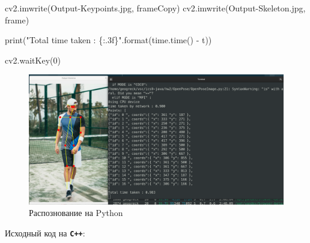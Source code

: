 \documentclass[
  12pt,
  a4paper,
]{article}
\newenvironment{Shaded}{}{}
\newcommand{\BuiltInTok}[1]{#1}
\newcommand{\DecValTok}[1]{\textcolor[rgb]{0.25,0.63,0.44}{#1}}
\newcommand{\NormalTok}[1]{#1}
\newcommand{\OperatorTok}[1]{\textcolor[rgb]{0.40,0.40,0.40}{#1}}
\newcommand{\SpecialCharTok}[1]{\textcolor[rgb]{0.25,0.44,0.63}{#1}}
\newcommand{\StringTok}[1]{\textcolor[rgb]{0.25,0.44,0.63}{#1}}
\begin{document}
\begin{Shaded}
\begin{Highlighting}[numbers=left,,]
\NormalTok{cv2.imwrite(}\StringTok{\textquotesingle{}Output{-}Keypoints.jpg\textquotesingle{}}\NormalTok{, frameCopy)}
\NormalTok{cv2.imwrite(}\StringTok{\textquotesingle{}Output{-}Skeleton.jpg\textquotesingle{}}\NormalTok{, frame)}

\BuiltInTok{print}\NormalTok{(}\StringTok{"Total time taken : }\SpecialCharTok{\{:.3f\}}\StringTok{"}\NormalTok{.}\BuiltInTok{format}\NormalTok{(time.time() }\OperatorTok{{-}}\NormalTok{ t))}

\NormalTok{cv2.waitKey(}\DecValTok{0}\NormalTok{)}
\end{Highlighting}
\end{Shaded}

\begin{figure}
\centering
\includegraphics{pics/hw2_pythonBody_out.png}
\caption{Распознование на Python}
\end{figure}

Исходный код на \textbf{\texttt{С++}}:
\end{document}
